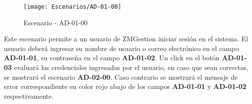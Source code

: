 \begin{figure}[H]
\centering
\texttt{[image: Escenarios/AD-01-00]}
\caption{Escenario - AD-01-00}
\label{fig:AD-01-00}
\end{figure}
    Este escenario permite a un usuario de ZMGestion iniciar sesión en el sistema. El usuario deberá ingresar su nombre de usuario o correo electrónico en el campo \textbf{AD-01-01}, su contraseña en el campo \textbf{AD-01-02}. Un click en el botón \textbf{AD-01-03} evaluará las credenciales ingresadas por el usuario, en caso que sean correctas, se mostrará el escenario \textbf{AD-02-00}. Caso contrario se mostrará el mensaje de error correspondiente en color rojo abajo de los campos \textbf{AD-01-01} y \textbf{AD-01-02} respectivamente.
\clearpage
